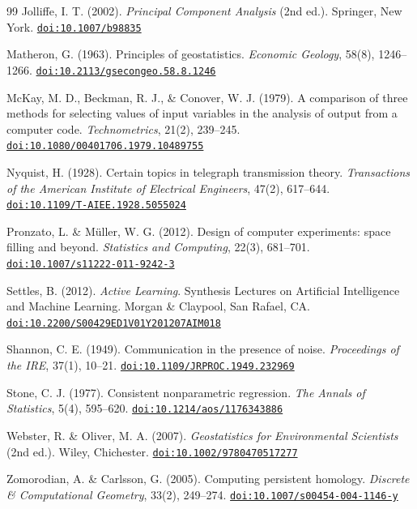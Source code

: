 \documentclass[12pt,a4paper]{article}
\providecommand{\doi}[1]{\href{https://doi.org/#1}{\texttt{doi:#1}}}
\begin{document}
\begin{thebibliography}{99}
Jolliffe, I. T. (2002).
\newblock \emph{Principal Component Analysis} (2nd ed.).
\newblock Springer, New York.
\newblock \doi{10.1007/b98835}

Matheron, G. (1963).
\newblock Principles of geostatistics.
\newblock \emph{Economic Geology}, 58(8), 1246--1266.
\newblock \doi{10.2113/gsecongeo.58.8.1246}

McKay, M. D., Beckman, R. J., \& Conover, W. J. (1979).
\newblock A comparison of three methods for selecting values of input variables
  in the analysis of output from a computer code.
\newblock \emph{Technometrics}, 21(2), 239--245.
\newblock \doi{10.1080/00401706.1979.10489755}

Nyquist, H. (1928).
\newblock Certain topics in telegraph transmission theory.
\newblock \emph{Transactions of the American Institute of Electrical
  Engineers}, 47(2), 617--644.
\newblock \doi{10.1109/T-AIEE.1928.5055024}

Pronzato, L. \& M{\"u}ller, W. G. (2012).
\newblock Design of computer experiments: space filling and beyond.
\newblock \emph{Statistics and Computing}, 22(3), 681--701.
\newblock \doi{10.1007/s11222-011-9242-3}

Settles, B. (2012).
\newblock \emph{Active Learning}.
\newblock Synthesis Lectures on Artificial Intelligence and Machine Learning.
\newblock Morgan \& Claypool, San Rafael, CA.
\newblock \doi{10.2200/S00429ED1V01Y201207AIM018}

Shannon, C. E. (1949).
\newblock Communication in the presence of noise.
\newblock \emph{Proceedings of the IRE}, 37(1), 10--21.
\newblock \doi{10.1109/JRPROC.1949.232969}

Stone, C. J. (1977).
\newblock Consistent nonparametric regression.
\newblock \emph{The Annals of Statistics}, 5(4), 595--620.
\newblock \doi{10.1214/aos/1176343886}

Webster, R. \& Oliver, M. A. (2007).
\newblock \emph{Geostatistics for Environmental Scientists} (2nd ed.).
\newblock Wiley, Chichester.
\newblock \doi{10.1002/9780470517277}

Zomorodian, A. \& Carlsson, G. (2005).
\newblock Computing persistent homology.
\newblock \emph{Discrete \& Computational Geometry}, 33(2), 249--274.
\newblock \doi{10.1007/s00454-004-1146-y}

\end{thebibliography}
\end{document}
